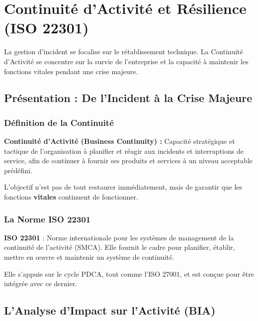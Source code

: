 \chapter{Continuité d'Activité et Résilience (ISO 22301)}
\label{chap:continuite}

La gestion d'incident se focalise sur le rétablissement technique. La Continuité d'Activité se concentre sur la survie de l'entreprise et la capacité à maintenir les fonctions vitales pendant une crise majeure.

\section{Présentation : De l'Incident à la Crise Majeure}

\subsection{Définition de la Continuité}

\begin{boxdef}
\textbf{Continuité d'Activité (Business Continuity) :} Capacité stratégique et tactique de l'organisation à planifier et réagir aux incidents et interruptions de service, afin de continuer à fournir ses produits et services à un niveau acceptable prédéfini.
\end{boxdef}

L'objectif n'est pas de tout restaurer immédiatement, mais de garantir que les fonctions \textbf{vitales} continuent de fonctionner.

\subsection{La Norme ISO 22301}

\begin{boxdef}
\textbf{ISO 22301} : Norme internationale pour les systèmes de management de la continuité de l'activité (SMCA). Elle fournit le cadre pour planifier, établir, mettre en œuvre et maintenir un système de continuité.
\end{boxdef}

Elle s'appuie sur le cycle PDCA, tout comme l'ISO 27001, et est conçue pour être intégrée avec ce dernier.

\section{L'Analyse d'Impact sur l'Activité (BIA)}

